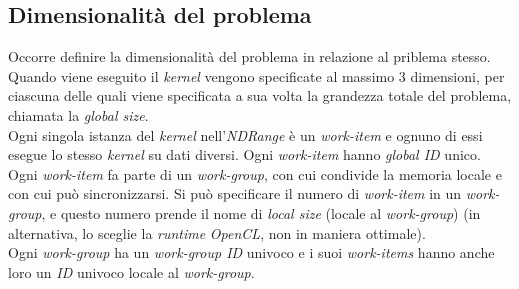 \subsection{Dimensionalità del problema}
Occorre definire la dimensionalità del problema in relazione al priblema stesso. \\
Quando viene eseguito il \textit{kernel} vengono specificate al massimo 3 dimensioni, per ciascuna delle quali viene specificata a sua volta la grandezza totale del problema, chiamata la \textit{global size}. \\
Ogni singola istanza del \textit{kernel} nell'\textit{NDRange} è un \textit{work-item} e ognuno di essi esegue lo stesso \textit{kernel} su dati diversi. Ogni \textit{work-item} hanno \textit{global ID} unico. \\
Ogni \textit{work-item} fa parte di un \textit{work-group}, con cui condivide la memoria locale e con cui può sincronizzarsi. Si può specificare il numero di \textit{work-item} in un \textit{work-group}, e questo numero prende il nome di \textit{local size} (locale al \textit{work-group}) (in alternativa, lo sceglie la \textit{runtime} \textit{OpenCL}, non in maniera ottimale). \\
Ogni \textit{work-group} ha un \textit{work-group ID} univoco e i suoi \textit{work-items} hanno anche loro un \textit{ID} univoco locale al \textit{work-group}.

